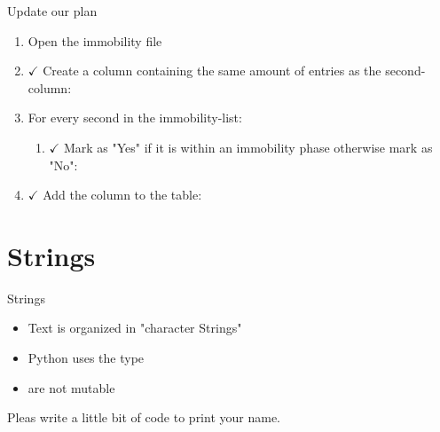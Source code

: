 \documentclass[aspectratio=169]{beamer}
\begin{document}
\begin{frame}{Update our plan}
\begin{enumerate}
\begin{enumerate}
{		
	}
\end{enumerate}
\item {Open the immobility file}
\item {\begin{math} \checkmark \end{math}
	Create a column containing the same amount of entries as the second-column:
}
\item {For every second in the immobility-list:}
\begin{enumerate}
	\item {\begin{math} \checkmark \end{math}
		Mark as "Yes" if it is within an immobility phase otherwise mark as "No":
	}
\end{enumerate}
\item {\begin{math} \checkmark \end{math}
	Add the column to the table:
}
\end{enumerate}
\end{frame}

\section{Strings}
\begin{frame}{Strings}
\begin{itemize}
	\item Text is organized in "character Strings"
	\item Python uses the type 
	\item {} are not mutable
\end{itemize}

Pleas write a little bit of code to print your name.

\end{frame}
\end{document}
